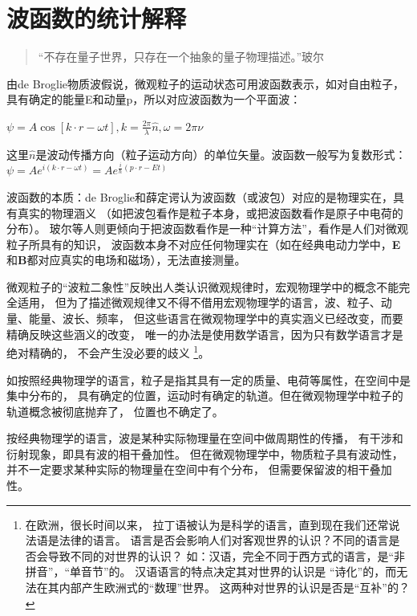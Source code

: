 \section{波函数的统计解释}

\begin{quotation}
``不存在量子世界，只存在一个抽象的量子物理描述。''\qquad 玻尔
\end{quotation}

由de Broglie物质波假说，微观粒子的运动状态可用波函数表示，如对自由粒子，
具有确定的能量E和动量p，所以对应波函数为一个平面波：


$\psi  = A\cos \left[ {k \cdot r - \omega t} \right],k = \frac{{2\pi }}{\lambda }\hat n,\omega  = 2\pi \nu $

这里$\hat n$是波动传播方向（粒子运动方向）的单位矢量。波函数一般写为复数形式：$\psi  = Ae^{i(k \cdot r - \omega t)}  = Ae^{\frac{i}{\hbar }(p \cdot r - Et)} $


波函数的本质：de Broglie和薛定谔认为波函数（或波包）对应的是物理实在，具有真实的物理涵义
（如把波包看作是粒子本身，或把波函数看作是原子中电荷的分布）。
玻尔等人则更倾向于把波函数看作是一种``计算方法''，看作是人们对微观粒子所具有的知识，
波函数本身不对应任何物理实在（如在经典电动力学中，\textbf{E}和\textbf{B}都对应真实的电场和磁场），无法直接测量。


微观粒子的``波粒二象性''反映出人类认识微观规律时，宏观物理学中的概念不能完全适用，
但为了描述微观规律又不得不借用宏观物理学的语言，波、粒子、动量、能量、波长、频率，
但这些语言在微观物理学中的真实涵义已经改变，而要精确反映这些涵义的改变，
唯一的办法是使用数学语言，因为只有数学语言才是绝对精确的，
不会产生没必要的歧义
\footnote{在欧洲，很长时间以来，
拉丁语被认为是科学的语言，直到现在我们还常说法语是法律的语言。
语言是否会影响人们对客观世界的认识？不同的语言是否会导致不同的对世界的认识？
如：汉语，完全不同于西方式的语言，是``非拼音''，``单音节''的。
汉语语言的特点决定其对世界的认识是 ``诗化''的，而无法在其内部产生欧洲式的``数理''世界。
这两种对世界的认识是否是``互补''的？}。

如按照经典物理学的语言，粒子是指其具有一定的质量、电荷等属性，在空间中是集中分布的，
具有确定的位置，运动时有确定的轨道。但在微观物理学中粒子的轨道概念被彻底抛弃了，
位置也不确定了。

按经典物理学的语言，波是某种实际物理量在空间中做周期性的传播，
有干涉和衍射现象，即具有波的相干叠加性。
但在微观物理学中，物质粒子具有波动性，
并不一定要求某种实际的物理量在空间中有个分布，
但需要保留波的相干叠加性。

